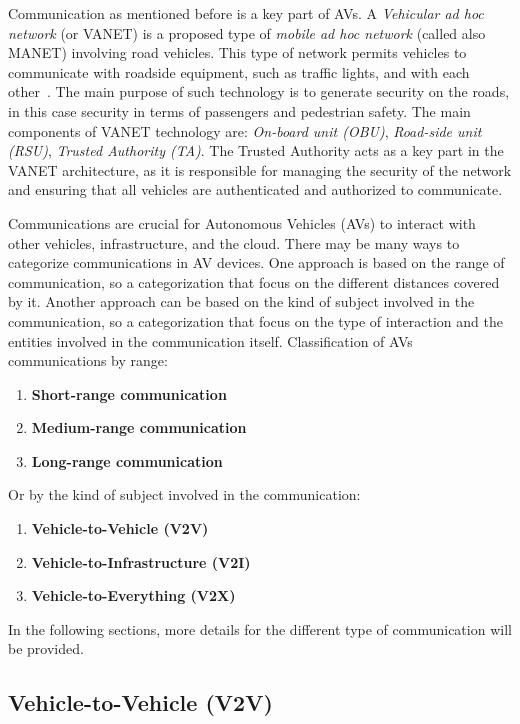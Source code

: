 Communication as mentioned before is a key part of AVs.
A \textit{Vehicular ad hoc network} (or VANET) is a proposed type of \textit{mobile ad hoc network} (called also MANET)
involving road vehicles.
This type of network permits vehicles to communicate with roadside equipment,
such as traffic lights, and with each other~\cite{sheikh2019comprehensive}.
The main purpose of such technology is to generate security on the roads,
in this case security in terms of passengers and pedestrian safety.
The main components of VANET technology are: \textit{On-board unit (OBU)},
\textit{Road-side unit (RSU)}, \textit{Trusted Authority (TA)}.
The Trusted Authority acts as a key part in the VANET architecture,
as it is responsible for managing the security of the network and ensuring that all vehicles are authenticated
and authorized to communicate.

Communications are crucial for Autonomous Vehicles (AVs) to interact with other vehicles, infrastructure, and the cloud.
There may be many ways to categorize communications in AV devices.
One approach is based on the range of communication,
so a categorization that focus on the different distances covered by it.
Another approach can be based on the kind of subject involved in the communication,
so a categorization that focus on the type of interaction and the entities involved in the communication itself.
Classification of AVs communications by range:
\begin{enumerate}
    \item \textbf{Short-range communication}
    \item \textbf{Medium-range communication}
    \item \textbf{Long-range communication}
\end{enumerate}

Or by the kind of subject involved in the communication:
\begin{enumerate}
    \item \textbf{Vehicle-to-Vehicle (V2V)}
    \item \textbf{Vehicle-to-Infrastructure (V2I)}
    \item \textbf{Vehicle-to-Everything (V2X)}
\end{enumerate}

In the following sections, more details for the different type of communication will be provided.

\subsection{Vehicle-to-Vehicle (V2V)}\label{subsec:vehicle-to-vehicle-(v2v)}

